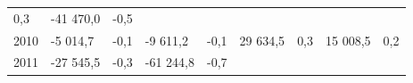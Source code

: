 \begin{longtable}[]{@{}lllllllll@{}}
\begin{minipage}[t]{0.06\columnwidth}
0,3\strut
\end{minipage} & \begin{minipage}[t]{0.09\columnwidth}\raggedright
-41 470,0\strut
\end{minipage} & \begin{minipage}[t]{0.06\columnwidth}\raggedright
-0,5\strut
\end{minipage}\tabularnewline
\begin{minipage}[t]{0.05\columnwidth}\raggedright
2010\strut
\end{minipage} & \begin{minipage}[t]{0.10\columnwidth}\raggedright
-5 014,7\strut
\end{minipage} & \begin{minipage}[t]{0.06\columnwidth}\raggedright
-0,1\strut
\end{minipage} & \begin{minipage}[t]{0.16\columnwidth}\raggedright
-9 611,2\strut
\end{minipage} & \begin{minipage}[t]{0.06\columnwidth}\raggedright
-0,1\strut
\end{minipage} & \begin{minipage}[t]{0.12\columnwidth}\raggedright
29 634,5\strut
\end{minipage} & \begin{minipage}[t]{0.06\columnwidth}\raggedright
0,3\strut
\end{minipage} & \begin{minipage}[t]{0.09\columnwidth}\raggedright
15 008,5\strut
\end{minipage} & \begin{minipage}[t]{0.06\columnwidth}\raggedright
0,2\strut
\end{minipage}\tabularnewline
\begin{minipage}[t]{0.05\columnwidth}\raggedright
2011\strut
\end{minipage} & \begin{minipage}[t]{0.10\columnwidth}\raggedright
-27 545,5\strut
\end{minipage} & \begin{minipage}[t]{0.06\columnwidth}\raggedright
-0,3\strut
\end{minipage} & \begin{minipage}[t]{0.16\columnwidth}\raggedright
-61 244,8\strut
\end{minipage} & \begin{minipage}[t]{0.06\columnwidth}\raggedright
-0,7\strut
\end{minipage} & \begin{minipage}[t]{0.12\columnwidth}\raggedright

\end{minipage}
\end{longtable}
